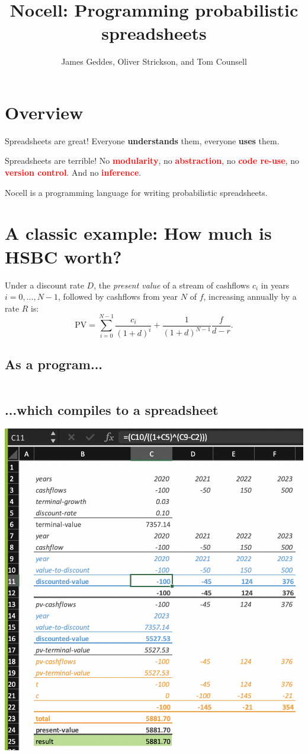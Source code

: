 \documentclass[twocolumn, 12pt]{article}
\title{Nocell: Programming prob\-ab\-il\-ist\-ic spreadsheets}
\author{James Geddes, Oliver Strickson, and Tom Counsell}
\date{}
\begin{document}
\maketitle
\thispagestyle{empty}
\section*{Overview}
Spreadsheets are great! Everyone \textcolor{OliveGreen}{\bfseries understands} them, everyone
\textcolor{OliveGreen}{\bfseries uses} them.

Spreadsheets are terrible! No \textcolor{red}{\bfseries modularity}, no
\textcolor{red}{\bfseries abstraction}, no \textcolor{red}{\bfseries code re-use}, no
\textcolor{red}{\bfseries version control}. And no \textcolor{red}{\bfseries inference}.

Nocell is a programming language for writing probabilistic spreadsheets.


\section*{A classic example: How much is HSBC worth?}
Under a discount rate $D$, the \emph{present value} of a stream of cashflows
$c_i$ in years $i=0,\dotsc,N-1$, followed by cashflows from year $N$ of $f$,
increasing annually by a rate $R$ is:
\[
\text{PV} = \sum_{i = 0}^{N-1} \frac{c_i}{{(1 + d)}^{i}}  +
\frac{1}{{(1+d)}^{N-1}} \frac{f}{d-r}.
\]

\subsection*{As a program...}
{\tiny
\inputminted{scheme}{demos/dcf.nocell}
}

\subsection*{...which compiles to a spreadsheet}
\begin{center}
\includegraphics[width=0.6\columnwidth]{figs/ss.png}
\end{center}
\end{document}
